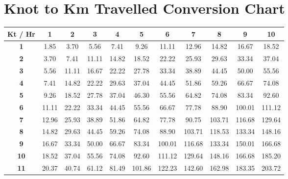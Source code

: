 \documentclass{article}
\begin{document}
\section{Knot to Km Travelled Conversion Chart}
\begin{table}[h]
\centering
\label{my-label}
\begin{tabular}{c|cccccccccc}
\textbf{Kt / Hr} & \textbf{1} & \textbf{2} & \textbf{3} & \textbf{4} & \textbf{5} & \textbf{6} & \textbf{7} & \textbf{8} & \textbf{9} & \textbf{10} \\
\hline
\textbf{1}       & 1.85       & 3.70       & 5.56       & 7.41       & 9.26       & 11.11      & 12.96      & 14.82      & 16.67      & 18.52       \\
\textbf{2}       & 3.70       & 7.41       & 11.11      & 14.82      & 18.52      & 22.22      & 25.93      & 29.63      & 33.34      & 37.04       \\
\textbf{3}       & 5.56       & 11.11      & 16.67      & 22.22      & 27.78      & 33.34      & 38.89      & 44.45      & 50.00      & 55.56       \\
\textbf{4}       & 7.41       & 14.82      & 22.22      & 29.63      & 37.04      & 44.45      & 51.86      & 59.26      & 66.67      & 74.08       \\
\textbf{5}       & 9.26       & 18.52      & 27.78      & 37.04      & 46.30      & 55.56      & 64.82      & 74.08      & 83.34      & 92.60       \\
\textbf{6}       & 11.11      & 22.22      & 33.34      & 44.45      & 55.56      & 66.67      & 77.78      & 88.90      & 100.01     & 111.12      \\
\textbf{7}       & 12.96      & 25.93      & 38.89      & 51.86      & 64.82      & 77.78      & 90.75      & 103.71     & 116.68     & 129.64      \\
\textbf{8}       & 14.82      & 29.63      & 44.45      & 59.26      & 74.08      & 88.90      & 103.71     & 118.53     & 133.34     & 148.16      \\
\textbf{9}       & 16.67      & 33.34      & 50.00      & 66.67      & 83.34      & 100.01     & 116.68     & 133.34     & 150.01     & 166.68      \\
\textbf{10}      & 18.52      & 37.04      & 55.56      & 74.08      & 92.60      & 111.12     & 129.64     & 148.16     & 166.68     & 185.20      \\
\textbf{11}      & 20.37      & 40.74      & 61.12      & 81.49      & 101.86     & 122.23     & 142.60     & 162.98     & 183.35     & 203.72      \\

\end{tabular}
\end{table}
\end{document}
